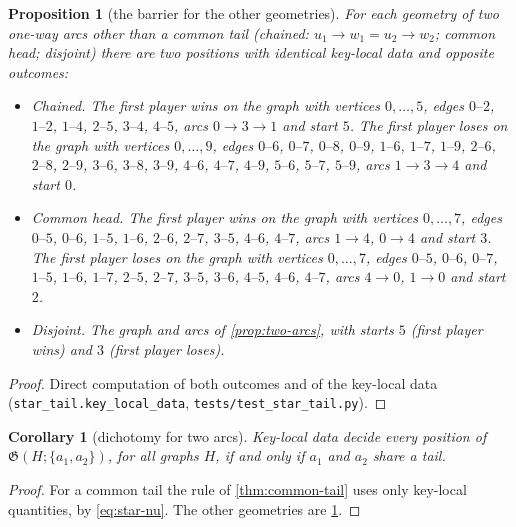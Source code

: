 \documentclass[11pt]{amsart}
\theoremstyle{plain}
\newtheorem{proposition}[theorem]{Proposition}
\newtheorem{corollary}[theorem]{Corollary}
\theoremstyle{definition}
\theoremstyle{remark}
\numberwithin{equation}{section}
\newcommand{\code}[1]{{\ttfamily\nolinkurl{#1}}}
\newcommand{\game}{\mathfrak{G}}          %
\begin{document}
\begin{proposition}[the barrier for the other geometries]\label{prop:barrier}
For each geometry of two one-way arcs other than a common tail (chained: $u_1\to w_1=u_2\to w_2$; common head; disjoint) there are two positions with identical key-local data and opposite outcomes:
\begin{itemize}
\item \emph{Chained.} The first player wins on the graph with vertices $0,\dots,5$, edges $0\text{--}2$, $1\text{--}2$, $1\text{--}4$, $2\text{--}5$, $3\text{--}4$, $4\text{--}5$, arcs $0\to3\to1$ and start $5$. The first player loses on the graph with vertices $0,\dots,9$, edges $0\text{--}6$, $0\text{--}7$, $0\text{--}8$, $0\text{--}9$, $1\text{--}6$, $1\text{--}7$, $1\text{--}9$, $2\text{--}6$, $2\text{--}8$, $2\text{--}9$, $3\text{--}6$, $3\text{--}8$, $3\text{--}9$, $4\text{--}6$, $4\text{--}7$, $4\text{--}9$, $5\text{--}6$, $5\text{--}7$, $5\text{--}9$, arcs $1\to3\to4$ and start $0$.
\item \emph{Common head.} The first player wins on the graph with vertices $0,\dots,7$, edges $0\text{--}5$, $0\text{--}6$, $1\text{--}5$, $1\text{--}6$, $2\text{--}6$, $2\text{--}7$, $3\text{--}5$, $4\text{--}6$, $4\text{--}7$, arcs $1\to4$, $0\to4$ and start $3$. The first player loses on the graph with vertices $0,\dots,7$, edges $0\text{--}5$, $0\text{--}6$, $0\text{--}7$, $1\text{--}5$, $1\text{--}6$, $1\text{--}7$, $2\text{--}5$, $2\text{--}7$, $3\text{--}5$, $3\text{--}6$, $4\text{--}5$, $4\text{--}6$, $4\text{--}7$, arcs $4\to0$, $1\to0$ and start $2$.
\item \emph{Disjoint.} The graph and arcs of \cref{prop:two-arcs}, with starts $5$ (first player wins) and $3$ (first player loses).
\end{itemize}
\end{proposition}
\begin{proof}
Direct computation of both outcomes and of the key-local data (\code{star_tail.key_local_data}, \code{tests/test_star_tail.py}).
\end{proof}

\begin{corollary}[dichotomy for two arcs]\label{cor:dichotomy}
Key-local data decide every position of $\game(H;\{a_1,a_2\})$, for all graphs $H$, if and only if $a_1$ and $a_2$ share a tail.
\end{corollary}
\begin{proof}
For a common tail the rule of \cref{thm:common-tail} uses only key-local quantities, by \eqref{eq:star-nu}. The other geometries are \cref{prop:barrier}.
\end{proof}
\end{document}
